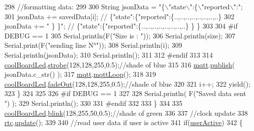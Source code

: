 \begin{DoxyCode}
298             \textcolor{comment}{//formatting data:}
299         
300             String jsonData = \textcolor{stringliteral}{"\{\(\backslash\)"state\(\backslash\)":\{\(\backslash\)"reported\(\backslash\)":"};
301             jsonData += savedData[i]; \textcolor{comment}{// \{"state":\{"reported":\{..,..,..,..,..,..,..,..\}}
302             jsonData += \textcolor{stringliteral}{" \} \}"}; \textcolor{comment}{// \{"state":\{"reported":\{..,..,..,..,..,..,..,..\}  \} \}}
303 
304 \textcolor{preprocessor}{        #if DEBUG == 1 }
305             Serial.println(F(\textcolor{stringliteral}{"Size is : "}));
306             Serial.println(size);
307             Serial.print(F(\textcolor{stringliteral}{"sending line N°"}));
308             Serial.println(i);
309             Serial.println(jsonData);
310             Serial.println();
311 
312 \textcolor{preprocessor}{        #endif}
313 
314             \hyperlink{classCoolBoard_a1b1d3c684a5baa56b08486e192fd8e97}{coolBoardLed}.\hyperlink{classCoolBoardLed_ad5f0de4c628cbfbf49896042831c64ad}{strobe}(128,128,255,0.5);\textcolor{comment}{//shade of blue}
315         
316             \hyperlink{classCoolBoard_a2399f44d7c23c1149a335cb3b46d90f1}{mqtt}.\hyperlink{classCoolMQTT_ace977b3e90ab14b1199fe5c4fb0a13ec}{publish}( jsonData.c\_str() );
317             \hyperlink{classCoolBoard_a2399f44d7c23c1149a335cb3b46d90f1}{mqtt}.\hyperlink{classCoolMQTT_aa5eaae967b562b62cbcf2b8d81f6e5d5}{mqttLoop}();
318         
319             \hyperlink{classCoolBoard_a1b1d3c684a5baa56b08486e192fd8e97}{coolBoardLed}.\hyperlink{classCoolBoardLed_a93d545679237e8cc858324367149775c}{fadeOut}(128,128,255,0.5);\textcolor{comment}{//shade of blue}
320             
321             i++;
322             yield();
323         \}       
324 
325 
326 \textcolor{preprocessor}{    #if DEBUG == 1}
327 
328         Serial.println( F(\textcolor{stringliteral}{"Saved data sent "}) );
329         Serial.println();
330     
331 \textcolor{preprocessor}{    #endif}
332 
333     \}
334 
335     \hyperlink{classCoolBoard_a1b1d3c684a5baa56b08486e192fd8e97}{coolBoardLed}.\hyperlink{classCoolBoardLed_a96e1ea13003eee34c9dbcef340404426}{blink}(128,255,50,0.5);\textcolor{comment}{//shade of green}
336 
337     \textcolor{comment}{//clock update}
338     \hyperlink{classCoolBoard_a50d2a6716879d64a85f3c6b44ad63275}{rtc}.\hyperlink{classCoolTime_aae601f795452cfa48d9fb337aed483a8}{update}();
339 
340     \textcolor{comment}{//read user data if user is active}
341     \textcolor{keywordflow}{if}(\hyperlink{classCoolBoard_a6395459131d6889a3005f79c7a35e964}{userActive})
342     \{

\end{DoxyCode}
